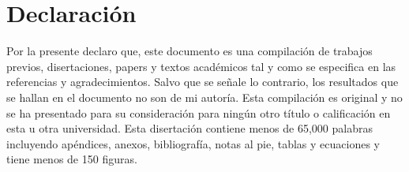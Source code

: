 \chapter*{\centering \Large Declaración}


Por la presente declaro que, este documento es una compilación de trabajos previos, disertaciones, papers y textos académicos tal y como se especifica en las referencias y agradecimientos. Salvo que se señale lo contrario, los resultados que se hallan en el documento no son de mi autoría. Esta compilación es original y no se ha presentado para su consideración para ningún otro título o calificación en esta u otra universidad. Esta disertación contiene menos de 65,000 palabras incluyendo apéndices, anexos, bibliografía, notas al pie, tablas y ecuaciones y tiene menos de 150 figuras.

{\flushright
\Author\\
\Date
\vfill}
